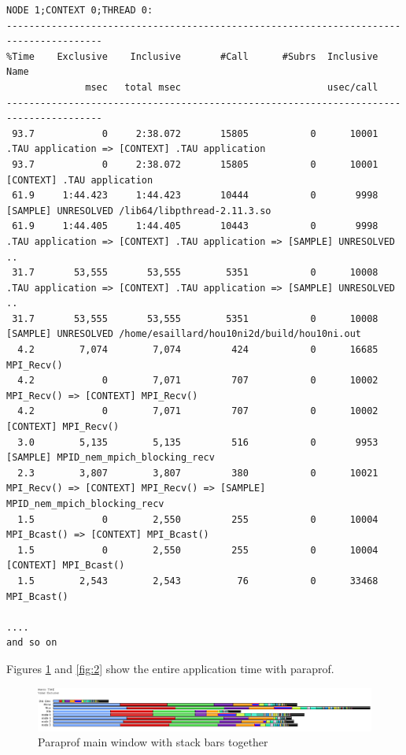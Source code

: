 \documentclass[10pt,twoside]{article}   	%
\begin{document}
{\begin{verbatim}
NODE 1;CONTEXT 0;THREAD 0:
---------------------------------------------------------------------------------------
%Time    Exclusive    Inclusive       #Call      #Subrs  Inclusive Name
              msec   total msec                          usec/call
---------------------------------------------------------------------------------------
 93.7            0     2:38.072       15805           0      10001 .TAU application => [CONTEXT] .TAU application
 93.7            0     2:38.072       15805           0      10001 [CONTEXT] .TAU application
 61.9     1:44.423     1:44.423       10444           0       9998 [SAMPLE] UNRESOLVED /lib64/libpthread-2.11.3.so
 61.9     1:44.405     1:44.405       10443           0       9998 .TAU application => [CONTEXT] .TAU application => [SAMPLE] UNRESOLVED ..
 31.7       53,555       53,555        5351           0      10008 .TAU application => [CONTEXT] .TAU application => [SAMPLE] UNRESOLVED ..
 31.7       53,555       53,555        5351           0      10008 [SAMPLE] UNRESOLVED /home/esaillard/hou10ni2d/build/hou10ni.out
  4.2        7,074        7,074         424           0      16685 MPI_Recv()
  4.2            0        7,071         707           0      10002 MPI_Recv() => [CONTEXT] MPI_Recv()
  4.2            0        7,071         707           0      10002 [CONTEXT] MPI_Recv()
  3.0        5,135        5,135         516           0       9953 [SAMPLE] MPID_nem_mpich_blocking_recv
  2.3        3,807        3,807         380           0      10021 MPI_Recv() => [CONTEXT] MPI_Recv() => [SAMPLE] MPID_nem_mpich_blocking_recv
  1.5            0        2,550         255           0      10004 MPI_Bcast() => [CONTEXT] MPI_Bcast()
  1.5            0        2,550         255           0      10004 [CONTEXT] MPI_Bcast()
  1.5        2,543        2,543          76           0      33468 MPI_Bcast()

....
and so on
\end{verbatim}
}

\noindent Figures \ref{fig:1} and \ref{fig:2} show the entire application time with paraprof. 

\begin{figure}[H]
\includegraphics[width=18cm]{IMAGES/ScreenShot2}
\caption{Paraprof main window with stack bars together}
\label{fig:1}
\end{figure}
\end{document}

